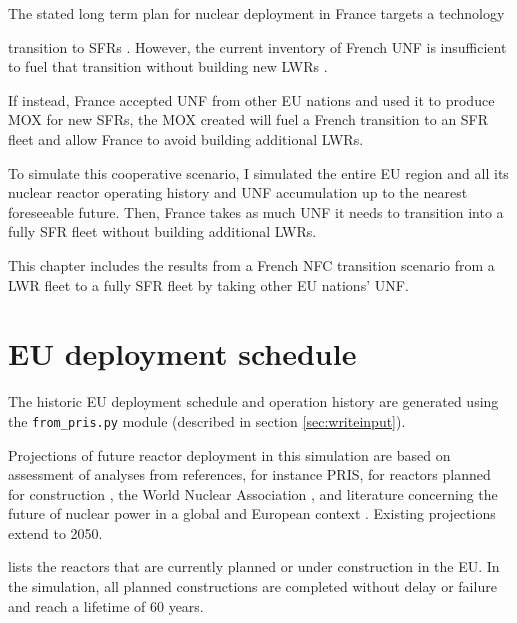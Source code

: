 
The stated long term plan for nuclear deployment in France targets a technology 

transition to \glspl{SFR} \cite{cne2_reports_2015}. However, the current inventory of French \gls{UNF} 
is insufficient to fuel that transition without building new \glspl{LWR} \cite{carre_overview_2009}.

If instead, France accepted 
\gls{UNF} from other \gls{EU} nations and used it to produce \gls{MOX} for new \glspl{SFR},
the \gls{MOX} created will fuel a French transition to an \gls{SFR} fleet
and allow France to avoid building additional \glspl{LWR}.

To simulate this cooperative scenario, I simulated the entire \gls{EU} region
and all its nuclear reactor operating history and \gls{UNF} accumulation up to the
nearest foreseeable future. Then, France takes as much \gls{UNF} it needs
to transition into a fully \gls{SFR} fleet without building additional \glspl{LWR}.

This chapter includes the results from a French \gls{NFC} transition
scenario from a \gls{LWR} fleet to a fully \gls{SFR} fleet by
taking other \gls{EU} nations' \gls{UNF}.


\section{\gls{EU} deployment schedule}

The historic \gls{EU} deployment schedule and operation history 
are generated using the \texttt{from\_pris.py}
module (described in section \ref{sec:writeinput}).

Projections of future reactor deployment in this simulation are based on
assessment of analyses from references, for instance \gls{PRIS}, for reactors planned
for construction \cite{iaea_nuclear_2017}, the World Nuclear Association
\cite{world_nuclear_association_nuclear_2017}, and literature concerning the future of
nuclear power in a global \cite{joskow_future_2012} and European context
\cite{hatch_politics_2015}.  Existing projections extend to 2050.

 lists the reactors that are currently  planned or
under construction in the \gls{EU}. In the simulation, all  planned constructions are completed 
without delay or failure and reach a lifetime of 60 years.  

